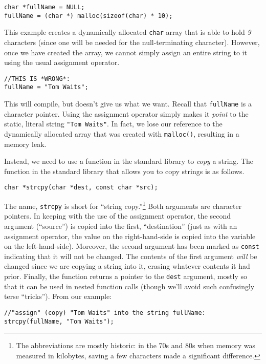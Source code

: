 \begin{verbatim}
char *fullName = NULL;
fullName = (char *) malloc(sizeof(char) * 10);
\end{verbatim}

This example creates a dynamically allocated \texttt{char} array
that is able to hold \emph{9} characters (since one will be needed for
the null-terminating character).  However, once we have created the array, 
we cannot simply assign an entire string to it using the usual assignment
operator.  

\begin{verbatim}
//THIS IS *WRONG*:
fullName = "Tom Waits";
\end{verbatim}

This will compile, but doesn't give us what we want.  Recall
that \texttt{fullName} is a character pointer.  Using
the assignment operator simply makes it \emph{point} to the
static, literal string \texttt{"Tom Waits"}.  In fact, 
we lose our reference to the dynamically allocated array that
was created with \texttt{malloc()}, resulting in a 
 \gls{memory leak}.

Instead, we need to use a function in the standard library to
\emph{copy} a string.  The function in the standard library 
that allows you to copy strings is as follows.

\texttt{char *strcpy(char *dest, const char *src);}

The name, \texttt{strcpy} is short for 
``string copy.''\footnote{The abbreviations are mostly historic: in the 70s and
80s when memory was measured in kilobytes, saving a few characters
made a significant difference.} Both arguments are character
pointers.  In keeping with the use of the assignment operator, 
the second argument (``source'') is copied into
the first, ``destination'' (just as with an assignment operator, 
the value on the right-hand-side is copied into the variable on 
the left-hand-side). Moreover, the second argument has been 
marked as \texttt{const} indicating that it will not be 
changed.  The contents of the first argument \emph{will} be 
changed since we are copying a string into it, erasing whatever 
contents it had prior.  Finally, the function returns a pointer 
to the \texttt{dest} argument, mostly so that it can be
used in nested function calls (though we'll avoid such confusingly
terse ``tricks'').  From our example:

\begin{verbatim}
//"assign" (copy) "Tom Waits" into the string fullName:
strcpy(fullName, "Tom Waits");
\end{verbatim}

